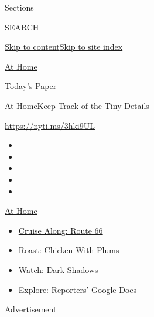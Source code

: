Sections

SEARCH

\protect\hyperlink{site-content}{Skip to
content}\protect\hyperlink{site-index}{Skip to site index}

\href{https://www.nytimes3xbfgragh.onion/spotlight/at-home}{At Home}

\href{https://myaccount.nytimes3xbfgragh.onion/auth/login?response_type=cookie\&client_id=vi}{}

\href{https://www.nytimes3xbfgragh.onion/section/todayspaper}{Today's
Paper}

\href{/spotlight/at-home}{At Home}\textbar{}Keep Track of the Tiny
Details

\url{https://nyti.ms/3hki9UL}

\begin{itemize}
\item
\item
\item
\item
\item
\end{itemize}

\href{https://www.nytimes3xbfgragh.onion/spotlight/at-home?action=click\&pgtype=Article\&state=default\&region=TOP_BANNER\&context=at_home_menu}{At
Home}

\begin{itemize}
\tightlist
\item
  \href{https://www.nytimes3xbfgragh.onion/2020/09/07/travel/route-66.html?action=click\&pgtype=Article\&state=default\&region=TOP_BANNER\&context=at_home_menu}{Cruise
  Along: Route 66}
\item
  \href{https://www.nytimes3xbfgragh.onion/2020/09/04/dining/sheet-pan-chicken.html?action=click\&pgtype=Article\&state=default\&region=TOP_BANNER\&context=at_home_menu}{Roast:
  Chicken With Plums}
\item
  \href{https://www.nytimes3xbfgragh.onion/2020/09/04/arts/television/dark-shadows-stream.html?action=click\&pgtype=Article\&state=default\&region=TOP_BANNER\&context=at_home_menu}{Watch:
  Dark Shadows}
\item
  \href{https://www.nytimes3xbfgragh.onion/interactive/2020/at-home/even-more-reporters-editors-diaries-lists-recommendations.html?action=click\&pgtype=Article\&state=default\&region=TOP_BANNER\&context=at_home_menu}{Explore:
  Reporters' Google Docs}
\end{itemize}

Advertisement

